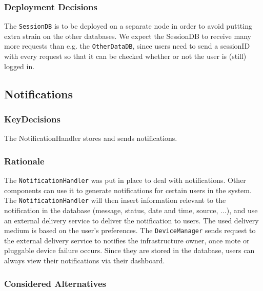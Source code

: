         \subsubsection*{Deployment Decisions}
            The \texttt{SessionDB} is to be deployed on a separate node in order to avoid puttting extra strain on the other databases.
            We expect the SessionDB to receive many more requests than e.g. the \texttt{OtherDataDB}, since users need to send a sessionID
            with every request so that it can be checked whether or not the user is (still) logged in.

    \subsection{Notifications}
        \subsubsection*{KeyDecisions}
            The NotificationHandler stores and sends notifications.

        \subsubsection*{Rationale}
            The \texttt{NotificationHandler} was put in place to deal with
            notifications. Other components can use it to generate notifications for
            certain users in the system. The \texttt{NotificationHandler} will then
            insert information relevant to the notification in the database (message,
            status, date and time, source, ...), and use an external delivery
            service to deliver the notification to users. The used delivery medium
            is based on the user's preferences. The \texttt{DeviceManager} sends request
            to the external delivery service to notifies the
            infrastructure owner, once mote or pluggable device failure occurs.
            Since they are stored in the database, users can always view
            their notifications via their dashboard. \\

        \subsubsection*{Considered Alternatives}
